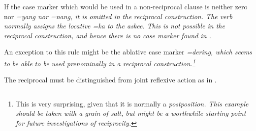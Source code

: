If the case marker which would be used in a non-reciprocal clause is neither zero nor \em =yang \em nor \em =nang\em, it is omitted in the reciprocal construction. The verb  normally assigns the locative \em =ka \em to the askee. This is not possible in the reciprocal construction, and hence there is no case marker found in .


An exception to this rule might be the ablative case marker \em =dering\em, which seems to be able to be used prenominally in a reciprocal construction.\footnote{This is very surprising, given that it is normally a \em post\em position. This example should be taken with a grain of salt, but might be a worthwhile starting point for future investigations of reciprocity.}


The reciprocal must be distinguished from joint reflexive action as in .







%






